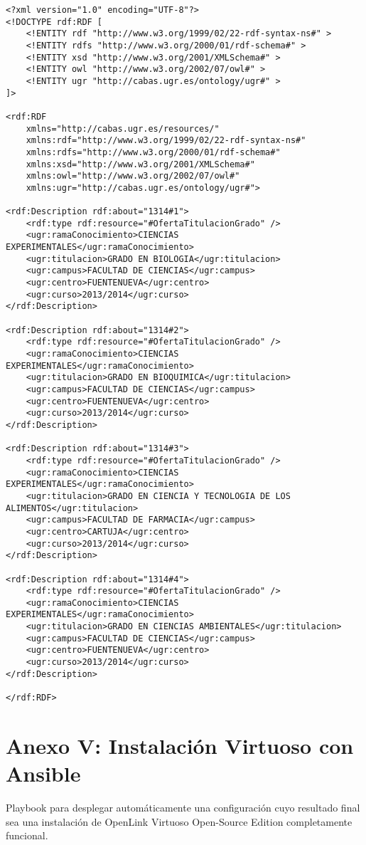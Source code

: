 \begin{verbatim}
<?xml version="1.0" encoding="UTF-8"?>
<!DOCTYPE rdf:RDF [
	<!ENTITY rdf "http://www.w3.org/1999/02/22-rdf-syntax-ns#" >
	<!ENTITY rdfs "http://www.w3.org/2000/01/rdf-schema#" >
	<!ENTITY xsd "http://www.w3.org/2001/XMLSchema#" >
	<!ENTITY owl "http://www.w3.org/2002/07/owl#" >
	<!ENTITY ugr "http://cabas.ugr.es/ontology/ugr#" >
]>

<rdf:RDF
	xmlns="http://cabas.ugr.es/resources/"
	xmlns:rdf="http://www.w3.org/1999/02/22-rdf-syntax-ns#"
	xmlns:rdfs="http://www.w3.org/2000/01/rdf-schema#"
	xmlns:xsd="http://www.w3.org/2001/XMLSchema#"
	xmlns:owl="http://www.w3.org/2002/07/owl#"
	xmlns:ugr="http://cabas.ugr.es/ontology/ugr#">

<rdf:Description rdf:about="1314#1">
	<rdf:type rdf:resource="#OfertaTitulacionGrado" />
	<ugr:ramaConocimiento>CIENCIAS EXPERIMENTALES</ugr:ramaConocimiento>
	<ugr:titulacion>GRADO EN BIOLOGI­A</ugr:titulacion>
	<ugr:campus>FACULTAD DE CIENCIAS</ugr:campus>
	<ugr:centro>FUENTENUEVA</ugr:centro>
	<ugr:curso>2013/2014</ugr:curso>
</rdf:Description>

<rdf:Description rdf:about="1314#2">
	<rdf:type rdf:resource="#OfertaTitulacionGrado" />
	<ugr:ramaConocimiento>CIENCIAS EXPERIMENTALES</ugr:ramaConocimiento>
	<ugr:titulacion>GRADO EN BIOQUI­MICA</ugr:titulacion>
	<ugr:campus>FACULTAD DE CIENCIAS</ugr:campus>
	<ugr:centro>FUENTENUEVA</ugr:centro>
	<ugr:curso>2013/2014</ugr:curso>
</rdf:Description>

<rdf:Description rdf:about="1314#3">
	<rdf:type rdf:resource="#OfertaTitulacionGrado" />
	<ugr:ramaConocimiento>CIENCIAS EXPERIMENTALES</ugr:ramaConocimiento>
	<ugr:titulacion>GRADO EN CIENCIA Y TECNOLOGI­A DE LOS ALIMENTOS</ugr:titulacion>
	<ugr:campus>FACULTAD DE FARMACIA</ugr:campus>
	<ugr:centro>CARTUJA</ugr:centro>
	<ugr:curso>2013/2014</ugr:curso>
</rdf:Description>

<rdf:Description rdf:about="1314#4">
	<rdf:type rdf:resource="#OfertaTitulacionGrado" />
	<ugr:ramaConocimiento>CIENCIAS EXPERIMENTALES</ugr:ramaConocimiento>
	<ugr:titulacion>GRADO EN CIENCIAS AMBIENTALES</ugr:titulacion>
	<ugr:campus>FACULTAD DE CIENCIAS</ugr:campus>
	<ugr:centro>FUENTENUEVA</ugr:centro>
	<ugr:curso>2013/2014</ugr:curso>
</rdf:Description>

</rdf:RDF>
\end{verbatim}

\chapter{Anexo V: Instalación Virtuoso con Ansible}

{\sf Playbook} para desplegar automáticamente una configuración cuyo resultado final sea una instalación de {\sf OpenLink Virtuoso Open-Source Edition} completamente funcional.

\label{anexo_v}
\inputminted[tabsize=2,breaklines]{yaml}{../../ansible/virtuoso.yml}
